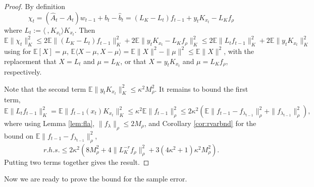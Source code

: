 \documentclass[twoside,11pt]{amsart}
\theoremstyle{theorem}
\theoremstyle{definition}
\theoremstyle{remark}
\def\<{{\langle}}
\def\>{{\rangle}}
\def\E{{\mathbb E}}        %
\def\A{\hat{A}}
\def\b{\hat{b}}
\def\M{M_\rho}
\def\la{\lambda}
\def\ka{\kappa}
\begin{document}
\begin{proof} By definition 
\[ \chi_t = (\A_t - A_t)w_{t-1} + b_t - \b_t = (L_K - L_t)f_{t-1} + y_t K_{x_t} - L_K f_\rho \]
where $L_t := \<\ , K_{x_t}\>K_{x_t} $. Then
\[ \E\|\chi_t\|_K^2 \leq 2 \E\|(L_K - L_t)f_{t-1} \|_K^2  +2 \E \|y_t K_{x_t} - L_K f_\rho \|_K^2 \leq 2 \E\| L_t f_{t-1}\|_K^2  +2 \E \|y_t K_{x_t} \|_K^2 \]
using for $\E[X]=\mu$, $\E\<X-\mu,X -\mu\> = \E\|X\|^2 - \|\mu\|^2 \leq \E\|X\|^2$, with the replacement that $X=L_t$ and $\mu=L_K$, or that 
$X=y_t K_{x_t}$ and $\mu=L_K f_\rho$, respectively. 

Note that the second term $\E\|y_t K_{x_t}\|_K^2 \leq \ka^2 \M^2$. It remains to bound the first term,
$$\E\| L_t f_{t-1}\|_K^2 = \E \|f_{t-1}(x_t) K_{x_t}\|_K^2 \leq \ka^2 \E \|f_{t-1}\|_\rho^2 \leq 
2 \ka^2 (\E \|f_{t-1} - f_{\la_{t-1}}\|_\rho^2 + \|f_{\la_{t-1}}\|_\rho^2), $$ 
where using Lemma \ref{lem:fla}, $\|f_{\la}\|_\rho \leq 2 \M$, and Corollary \ref{cor:rvarbnd} for the bound on $\E\|f_{t-1}-f_{\la_{t-1}}\|_\rho^2$, 
\[ r.h.s. \leq 2 \ka^2(8 \M^2 + 4\|L_K^{-r} f_\rho \|_\rho^2 + 3 (4\ka^2+1) \ka^2 \M^2 ) . \]
Putting two terms together gives the result.
\end{proof}

Now we are ready to prove the bound for the sample error. 
\end{document}
